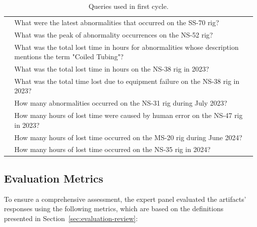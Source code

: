 \begin{table}[h]
\begin{tabular}{|p{.1\linewidth}|p{.9\linewidth}|}
                & What were the latest abnormalities that occurred on the SS-70 rig? \\ \cline{2-2}
                & What was the peak of abnormality occurrences on the NS-52 rig? \\ \cline{2-2}
                & What was the total lost time in hours for abnormalities whose description mentions the term "Coiled Tubing"? \\ \cline{2-2}
                & What was the total lost time in hours on the NS-38 rig in 2023? \\ \cline{2-2}
                & What was the total time lost due to equipment failure on the NS-38 rig in 2023? \\ \cline{2-2}
                & How many abnormalities occurred on the NS-31 rig during July 2023? \\ \cline{2-2}
                & How many hours of lost time were caused by human error on the NS-47 rig in 2023? \\ \cline{2-2}
                & How many hours of lost time occurred on the MS-20 rig during June 2024? \\ \cline{2-2}
                & How many hours of lost time occurred on the NS-35 rig in 2024? \\
                \hline
                \end{tabular}
                \fussy
                \caption{Queries used in first cycle. }
                \label{table:question_examples}
            \end{table}

        \subsection{Evaluation Metrics} \label{sec:evaluation_metrics}

            To ensure a comprehensive assessment, the expert panel evaluated the artifacts' responses using the following metrics, which are based on the definitions presented in Section~\ref{sec:evaluation-review}:

